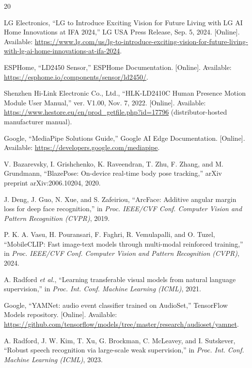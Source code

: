 \documentclass[conference]{IEEEtran}
\begin{document}
\FloatBarrier
\begin{thebibliography}{20}

LG Electronics,
``LG to Introduce Exciting Vision for Future Living with
LG AI Home Innovations at IFA 2024,''
LG USA Press Release, Sep. 5, 2024.
[Online]. Available:
\url{https://www.lg.com/us/lg-to-introduce-exciting-vision-for-future-living-with-lg-ai-home-innovations-at-ifa-2024}.

ESPHome,
``LD2450 Sensor,''
ESPHome Documentation.
[Online]. Available:
\url{https://esphome.io/components/sensor/ld2450/}.

Shenzhen Hi-Link Electronic Co., Ltd.,
``HLK-LD2410C Human Presence Motion Module User Manual,''
ver. V1.00, Nov. 7, 2022.
[Online]. Available:
\url{https://www.hestore.eu/en/prod_getfile.php?id=17796}
(distributor-hosted manufacturer manual).

Google,
``MediaPipe Solutions Guide,''
Google AI Edge Documentation.
[Online]. Available:
\url{https://developers.google.com/mediapipe}.

V. Bazarevsky, I. Grishchenko, K. Raveendran, T. Zhu,
F. Zhang, and M. Grundmann,
``BlazePose: On-device real-time body pose tracking,''
arXiv preprint arXiv:2006.10204, 2020.

J. Deng, J. Guo, N. Xue, and S. Zafeiriou,
``ArcFace: Additive angular margin loss for deep face recognition,''
in \emph{Proc. IEEE/CVF Conf. Computer Vision and
Pattern Recognition (CVPR)}, 2019.

P. K. A. Vasu, H. Pouransari, F. Faghri,
R. Vemulapalli, and O. Tuzel,
``MobileCLIP: Fast image-text models through multi-modal
reinforced training,''
in \emph{Proc. IEEE/CVF Conf. Computer Vision and
Pattern Recognition (CVPR)}, 2024.

A. Radford \emph{et al.},
``Learning transferable visual models from natural
language supervision,''
in \emph{Proc. Int. Conf. Machine Learning (ICML)}, 2021.

Google,
``YAMNet: audio event classifier trained on AudioSet,''
TensorFlow Models repository.
[Online]. Available:
\url{https://github.com/tensorflow/models/tree/master/research/audioset/yamnet}.

A. Radford, J. W. Kim, T. Xu, G. Brockman,
C. McLeavey, and I. Sutskever,
``Robust speech recognition via large-scale weak supervision,''
in \emph{Proc. Int. Conf. Machine Learning (ICML)}, 2023.


\end{thebibliography}
\end{document}
